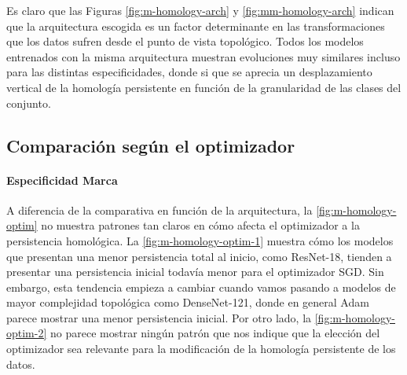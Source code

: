 Es claro que las Figuras \ref{fig:m-homology-arch} y \ref{fig:mm-homology-arch} indican que la arquitectura escogida es un factor determinante en las transformaciones que los datos sufren desde el punto de vista topológico. Todos los modelos entrenados con la misma arquitectura muestran evoluciones muy similares incluso para las distintas especificidades, donde si que se aprecia un desplazamiento vertical de la homología persistente en función de la granularidad de las clases del conjunto. 

\subsection{Comparación según el optimizador}
\label{subsec:optim}

\paragraph{Especificidad Marca}

A diferencia de la comparativa en función de la arquitectura, la \autoref{fig:m-homology-optim} no muestra patrones tan claros en cómo afecta el optimizador a la persistencia homológica. La \autoref{fig:m-homology-optim-1} muestra cómo los modelos que presentan una menor persistencia total al inicio, como ResNet-18, tienden a presentar una persistencia inicial todavía menor para el optimizador SGD. Sin embargo, esta tendencia empieza a cambiar cuando vamos pasando a modelos de mayor complejidad topológica como DenseNet-121, donde en general Adam parece mostrar una menor persistencia inicial. Por otro lado, la \autoref{fig:m-homology-optim-2} no parece mostrar ningún patrón que nos indique que la elección del optimizador sea relevante para la modificación de la homología persistente de los datos.

